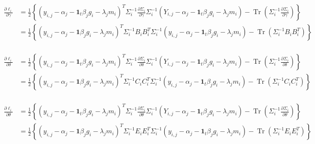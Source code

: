 \documentclass[hidelinks]{article}
\DeclareMathOperator{\Tr}{Tr}
\begin{document}
\begingroup
\large
\begin{equation*}
\begin{split}
\frac{\partial \ell_i }{\partial \gamma} &= \frac{1}{2} \left\{ \left(y_{i,j}-\alpha_{j}-\textbf{1}_t \beta_j g_i- \lambda_j m_i\right)^T \Sigma_i^{-1} \frac{\partial \Sigma_i }{\partial \gamma}\Sigma_i^{-1} \left(Y_{i,j}-\alpha_{j}-\textbf{1}_t \beta_j g_i - \lambda_j m_i \right) - \Tr \left( \Sigma_i^{-1}  \frac{\partial \Sigma_i }{\partial \gamma}\right) \right\}\\
&=\frac{1}{2} \left\{ \left(y_{i,j}-\alpha_{j}-\textbf{1} \beta_j g_i - \lambda_j m_i\right)^T \Sigma_i^{-1} B_iB_i^T \Sigma_i^{-1}  \left(y_{i,j}-\alpha_{j}-\textbf{1}_t \beta_j g_i - \lambda_j m_i\right) - \Tr \left( \Sigma_i^{-1}  B_iB_i^T\right) \right\} \\
\end{split}
\end{equation*}
\endgroup

\begingroup
\large
\begin{equation*}
\begin{split}
\frac{\partial \ell_i }{\partial \delta} &= \frac{1}{2} \left\{ \left(y_{i,j}-\alpha_{j}-\textbf{1}_t \beta_j g_i - \lambda_j m_i\right)^T \Sigma_i^{-1} \frac{\partial \Sigma_i }{\partial \delta}\Sigma_i^{-1} \left(Y_{i,j}-\alpha_{j}-\textbf{1}_t \beta_j g_i - \lambda_j m_i\right) - \Tr \left( \Sigma_i^{-1}  \frac{\partial \Sigma_i }{\partial \delta}\right) \right\}\\
&=\frac{1}{2} \left\{ \left(y_{i,j}-\alpha_{j}-\textbf{1} \beta_j g_i - \lambda_j m_i\right)^T \Sigma_i^{-1} C_iC_i^T \Sigma_i^{-1}  \left(y_{i,j}-\alpha_{j}-\textbf{1}_t \beta_j g_i - \lambda_j m_i \right) - \Tr \left( \Sigma_i^{-1}  C_iC_i^T\right) \right\} \\
\end{split}
\end{equation*}
\endgroup

\begingroup
\large
\begin{equation*}
\begin{split}
\frac{\partial \ell_i }{\partial \theta} &= \frac{1}{2} \left\{ \left(y_{i,j}-\alpha_{j}-\textbf{1}_t \beta_j g_i - \lambda_j m_i \right)^T \Sigma_i^{-1} \frac{\partial \Sigma_i }{\partial \theta}\Sigma_i^{-1} \left(Y_{i,j}-\alpha_{j}-\textbf{1}_t \beta_j g_i- \lambda_j m_i \right) - \Tr \left( \Sigma_i^{-1}  \frac{\partial \Sigma_i }{\partial \theta}\right) \right\}\\
&=\frac{1}{2} \left\{ \left(y_{i,j}-\alpha_{j}-\textbf{1} \beta_j g_i - \lambda_j m_i\right)^T \Sigma_i^{-1} E_i E_i^T \Sigma_i^{-1}  \left(y_{i,j}-\alpha_{j}-\textbf{1}_t \beta_j g_i - \lambda_j m_i\right) - \Tr \left( \Sigma_i^{-1}  E_i E_i^T\right) \right\} \\
\end{split}
\end{equation*}
\endgroup
\end{document}

